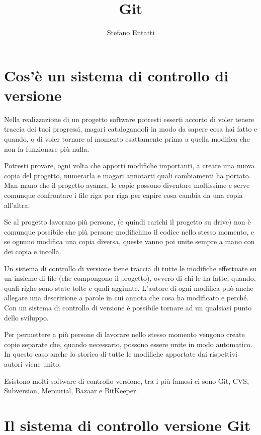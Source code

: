 \documentclass{article}
\title{Git} \date{\vspace{-5ex}} \author{Stefano Entatti}
\begin{document}
\maketitle

\section{Cos'è un sistema di controllo di versione}

Nella realizzazione di un progetto software potresti esserti accorto di voler
tenere traccia dei tuoi progressi, magari catalogandoli in modo da sapere cosa
hai fatto e quando, o di voler tornare al momento esattamente prima a quella
modifica che non fa funzionare più nulla. 

Potresti provare, ogni volta che apporti modifiche importanti, a creare una
nuova copia del progetto, numerarla e magari annotarti quali cambiamenti ha
portato. Man mano che il progetto avanza, le copie possono diventare moltissime
e serve comunque confrontare i file riga per riga per capire cosa cambia da una
copia all'altra.

Se al progetto lavorano più persone, (e quindi carichi il progetto su drive) non
è comunque possibile che più persone modifichino il codice nello stesso momento,
e se ognuno modifica una copia diversa, queste vanno poi unite sempre a mano con
dei copia e incolla.

Un sistema di controllo di versione tiene traccia di tutte le modifiche
effettuate su un insieme di file (che compongono il progetto), ovvero di chi le
ha fatte, quando, quali righe sono state tolte e quali aggiunte. L'autore di
ogni modifica può anche allegare una descrizione a parole in cui annota che cosa
ha modificato e perché. Con un sistema di controllo di versione è possibile
tornare ad un qualsiasi punto dello sviluppo.

Per permettere a più persone di lavorare nello stesso momento vengono create
copie separate che, quando necessario, possono essere unite in modo automatico.
In questo caso anche lo storico di tutte le modifiche apportate dai rispettivi
autori viene unito.

Esistono molti software di controllo versione, tra i più famosi ci sono Git,
CVS, Subversion, Mercurial, Bazaar e BitKeeper.

\section{Il sistema di controllo versione Git}
\end{document}
